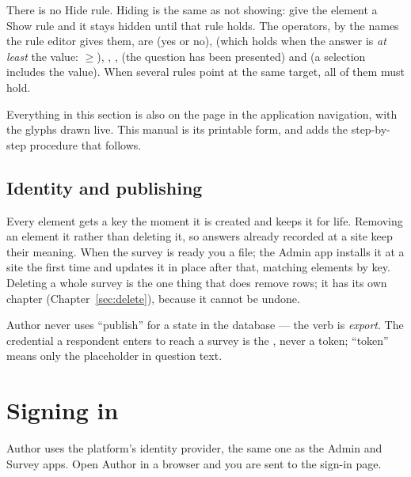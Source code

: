 \documentclass[11pt, a4paper]{article}
\begin{document}
There is no Hide rule. Hiding is the same as not showing: give the element a Show rule and it
stays hidden until that rule holds. The operators, by the names the rule editor gives them, are
 (yes or no),  (which holds when the answer is \emph{at least} the
value: $\geq$), , ,  (the question has been presented)
and  (a selection includes the value). When several rules point at the same target,
all of them must hold.

\begin{elicitnote}
Everything in this section is also on the  page in the application
navigation, with the glyphs drawn live. This manual is its printable form, and adds the
step-by-step procedure that follows.
\end{elicitnote}

\subsection{Identity and publishing}

Every element gets a key the moment it is created and keeps it for life. Removing an element
 it rather than deleting it, so answers already recorded at a site keep their
meaning. When the survey is ready you  a  file; the Admin app
installs it at a site the first time and updates it in place after that, matching elements by
key. Deleting a whole survey is the one thing that does remove rows; it has its own chapter
(Chapter~\ref{sec:delete}), because it cannot be undone.

\begin{elicitnote}[Vocabulary]
Author never uses “publish” for a state in the database — the verb is \emph{export}. The
credential a respondent enters to reach a survey is the , never a token;
“token” means only the  placeholder in question text.
\end{elicitnote}

\section{Signing in}
\label{sec:signin}

Author uses the platform's identity provider, the same one as the Admin and Survey apps. Open
Author in a browser and you are sent to the sign-in page.
\end{document}

